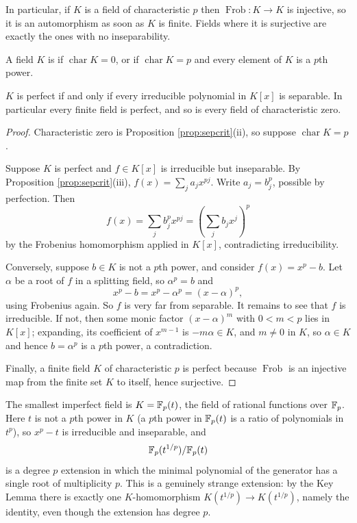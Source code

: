 \documentclass[a4paper]{scrartcl}
\newcommand{\charr}{\operatorname{char}}
\newcommand{\Frob}{\operatorname{Frob}}
\begin{document}
In particular, if $K$ is a field of characteristic $p$ then $\Frob : K \to K$ is injective, so it is an automorphism as soon as $K$ is finite. Fields where it is surjective are exactly the ones with no inseparability.

\begin{definition}
	A field $K$ is  if $\charr K = 0$, or if $\charr K = p$ and every element of $K$ is a $p$th power.
\end{definition}

\begin{proposition}\label{prop:perfect}
	$K$ is perfect if and only if every irreducible polynomial in $K[x]$ is separable. In particular every finite field is perfect, and so is every field of characteristic zero.
\end{proposition}

\begin{proof}
	Characteristic zero is Proposition \ref{prop:sepcrit}(ii), so suppose $\charr K = p$.

	Suppose $K$ is perfect and $f \in K[x]$ is irreducible but inseparable. By Proposition \ref{prop:sepcrit}(iii), $f(x) = \sum_j a_j x^{pj}$. Write $a_j = b_j^p$, possible by perfection. Then
	$$f(x) = \sum_j b_j^p x^{pj} = \left(\sum_j b_j x^j\right)^p$$
	by the Frobenius homomorphism applied in $K[x]$, contradicting irreducibility.

	Conversely, suppose $b \in K$ is not a $p$th power, and consider $f(x) = x^p - b$. Let $\alpha$ be a root of $f$ in a splitting field, so $\alpha^p = b$ and
	$$x^p - b = x^p - \alpha^p = (x-\alpha)^p,$$
	using Frobenius again. So $f$ is very far from separable. It remains to see that $f$ is irreducible. If not, then some monic factor $(x-\alpha)^m$ with $0 < m < p$ lies in $K[x]$; expanding, its coefficient of $x^{m-1}$ is $-m\alpha \in K$, and $m \neq 0$ in $K$, so $\alpha \in K$ and hence $b = \alpha^p$ is a $p$th power, a contradiction.

	Finally, a finite field $K$ of characteristic $p$ is perfect because $\Frob$ is an injective map from the finite set $K$ to itself, hence surjective.
\end{proof}

\begin{example}
	The smallest imperfect field is $K = \mathbb{F}_p(t)$, the field of rational functions over $\mathbb{F}_p$. Here $t$ is not a $p$th power in $K$ (a $p$th power in $\mathbb{F}_p(t)$ is a ratio of polynomials in $t^p$), so $x^p - t$ is irreducible and inseparable, and
	$$\mathbb{F}_p(t^{1/p}) / \mathbb{F}_p(t)$$
	is a degree $p$ extension in which the minimal polynomial of the generator has a single root of multiplicity $p$. This is a genuinely strange extension: by the Key Lemma there is exactly one $K$-homomorphism $K(t^{1/p}) \to K(t^{1/p})$, namely the identity, even though the extension has degree $p$.
\end{example}
\end{document}
